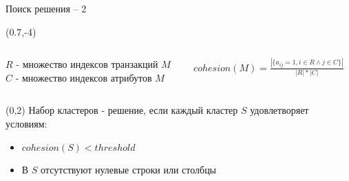 \documentclass[10pt, dvipsnames]{beamer}
\begin{document}
\begin{frame}{Поиск решения -- 2}
	\begin{textblock}{13}(0.7,-4)
		\begin{columns}
			\begin{column}{0.47\textwidth}
	$R$ - множество индексов транзакций $M$\\[0.2cm]
	$C$ - множество индексов атрибутов $M$
			\end{column}
			\begin{column}{0.6\textwidth}
	$cohesion(M) = \displaystyle\frac{|\{a_{ij} = 1, i \in R \land j \in C\}|}{|R|*|C|}$
			\end{column}
		\end{columns}
	\end{textblock}
	\begin{textblock}{13}(0,2)
	Набор кластеров - решение, если каждый кластер $S$ удовлетворяет условиям: 
		\begin{itemize}
		\item $cohesion(S) < threshold$
		\item В $S$ отсутствуют нулевые строки или столбцы
		\end{itemize} 
	\end{textblock}
\end{frame}

\end{document}

